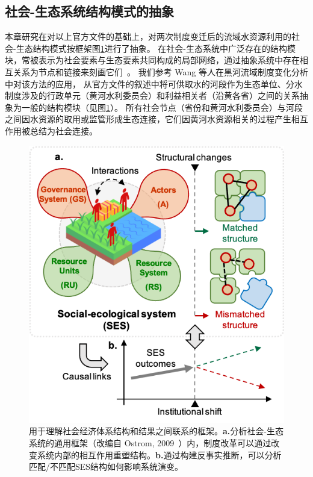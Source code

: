 \subsection{社会-生态系统结构模式的抽象}\label{sec:structures}

本章研究在对以上官方文件的基础上，对两次制度变迁后的流域水资源利用的社会-生态结构模式按框架图\ref{fig:framework}进行了抽象。
在社会-生态系统中广泛存在的结构模块，常被表示为社会要素与生态要素共同构成的局部网络，通过抽象系统中存在相互关系为节点和链接来刻画它们~\cite{bodin2017a,kluger2020,guerrero2015}。
我们参考 Wang 等人在黑河流域制度变化分析中对该方法的应用\cite{wang2019d}，
从官方文件的叙述中将可供取水的河段作为生态单位、分水制度涉及的行政单元（黄河水利委员会）和利益相关者（沿黄各省）之间的关系抽象为一般的结构模块（见图\ref{fig:framework}）。
所有社会节点（省份和黄河水利委员会）与河段之间因水资源的取用或监管形成生态连接，它们因黄河水资源相关的过程产生相互作用被总结为社会连接。

\begin{figure}[htb] %
    \centering
    \includegraphics[width=\textwidth]{img/ch5/framework.png}
    \caption[用于理解社会经济体系结构和结果之间联系的框架]{用于理解社会经济体系结构和结果之间联系的框架。\textbf{a.}分析社会-生态系统的通用框架（改编自 Ostrom, 2009~\cite{ostrom2009}）内，制度改革可以通过改变系统内部的相互作用重塑结构。\textbf{b.}通过构建反事实推断，可以分析匹配/不匹配SES结构如何影响系统演变。}\label{fig:framework}
\end{figure}

